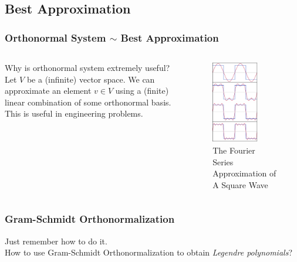 \documentclass{beamer}
\newcommand{\nullspace}{~\\[15pt]}
\begin{document}
\subsection{Best Approximation}
\begin{frame}
    \frametitle{Orthonormal System $\sim$ Best Approximation}
    \begin{columns}
        Why is orthonormal system extremely useful?
        \nullspace
        Let $V$ be a (infinite) vector space. We can approximate an element $v\in V$ using a (finite) linear combination of some orthonormal basis. This is useful in engineering problems.
        \begin{figure}[H]
            \centering
            \includegraphics[width=0.7\textwidth]{2020-05-04-01-36-07.png}
            \caption{The Fourier Series Approximation of A Square Wave}
            \end{figure}
    \end{columns}   
\end{frame}

\begin{frame}
    \frametitle{Gram-Schmidt Orthonormalization}
    Just remember how to do it.
    \nullspace
    How to use Gram-Schmidt Orthonormalization to obtain \textit{Legendre polynomials}?
\end{frame}
\end{document}
